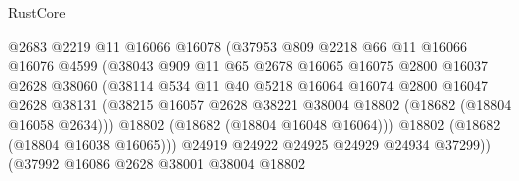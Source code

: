 \begin{lexlean}{RustCore}
\begin{coremodule}
                                  @2683
                                  @2219
                                  @11
                                  @16066
                                  @16078
                                  (@37953
                                    @809
                                    @2218
                                    @66
                                    @11
                                    @16066
                                    @16076
                                    @4599
                                    (@38043
                                      @909
                                      @11
                                      @65
                                      @2678
                                      @16065
                                      @16075
                                      @2800
                                      @16037
                                      @2628
                                      @38060
                                      (@38114
                                        @534
                                        @11
                                        @40
                                        @5218
                                        @16064
                                        @16074
                                        @2800
                                        @16047
                                        @2628
                                        @38131
                                        (@38215
                                          @16057
                                          @2628
                                          @38221
                                          @38004
                                          @18802
                                          (@18682 (@18804 @16058 @2634)))
                                        @18802
                                        (@18682 (@18804 @16048 @16064)))
                                      @18802
                                      (@18682 (@18804 @16038 @16065)))
                                    @24919
                                    @24922
                                    @24925
                                    @24929
                                    @24934
                                    @37299))
                                (@37992
                                  @16086
                                  @2628
                                  @38001
                                  @38004
                                  @18802

\end{coremodule}
\end{lexlean}

